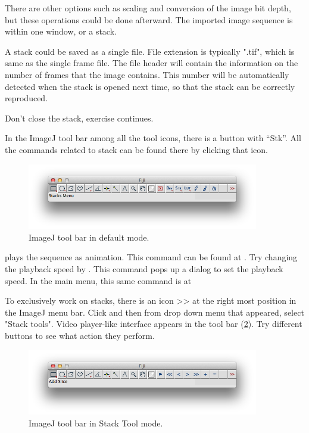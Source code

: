 \begin{indentexercise}{1}
There are other options such as scaling and conversion of the image bit depth,
but these operations could be done afterward. The imported image sequence is within one window, or a stack.

A stack could be saved as a single file. File extension is
typically ".tif", which is same as the single frame file. The file header will contain the
information on the number of frames that the image contains. This number
will be automatically detected when the stack is opened next time, so that the stack can be correctly reproduced. 
\end{indentexercise}

Don't close the stack, exercise continues. 

\begin{indentexercise}{2}

In the ImageJ tool bar among all the tool icons, there is a button with ``Stk''. All the commands related to stack can be found there by clicking that icon. 

\begin{figure}[htbp]
\begin{center}
\includegraphics[width=0.9\textwidth]{fig/fijiMenu.png}
\caption{ ImageJ tool bar in default mode.}
\label{fig:img130}
\end{center}
\end{figure}

 plays the sequence as animation. This command can be found at . 
Try changing the playback speed by . This command pops up a dialog to set the playback speed. In the main menu, this same command is at  

To exclusively work on stacks, there is an icon >> at the right most position in the ImageJ menu bar. Click and then from drop down menu that appeared, select "Stack tools". Video player-like interface appears in the tool bar (\ref{fig:img130}). Try different buttons to see what action they perform. 

\begin{figure}[htbp]
\begin{center}
\includegraphics[width=0.9\textwidth]{fig/fijiMenu_StackMode.png}
\caption{ ImageJ tool bar in Stack Tool mode.}
\label{fig:img130}
\end{center}
\end{figure}


\end{indentexercise}
